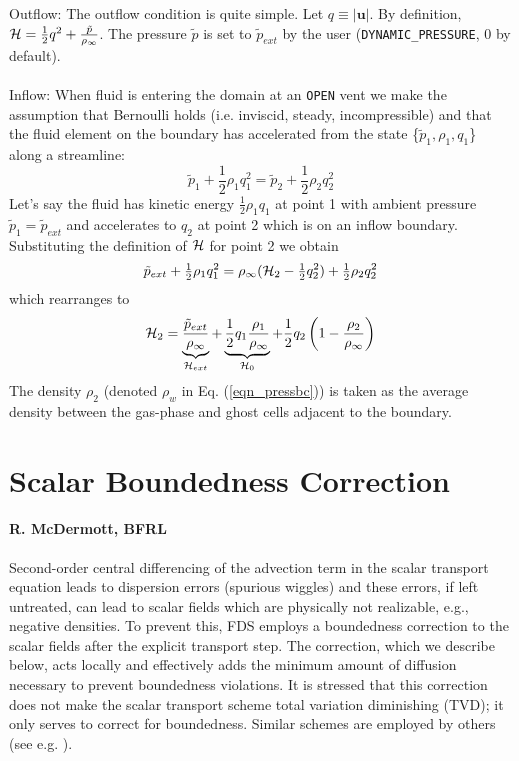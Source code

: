 \documentclass[11pt]{book}
\begin{document}
Outflow: The outflow condition is quite simple.  Let $q \equiv |\mathbf{u}|$. By definition, ${\cal H} = \frac{1}{2}q^2 + \frac{\tilde{p}}{\rho_\infty}$.  The pressure $\tilde{p}$ is set to $\tilde{p}_{ext}$ by the user ({\tt DYNAMIC\_PRESSURE}, 0 by default).
\\
\\
Inflow: When fluid is entering the domain at an {\tt OPEN} vent we make the assumption that Bernoulli holds (i.e. inviscid, steady, incompressible) and that the fluid element on the boundary has accelerated from the state \{$\tilde{p}_1,\rho_1,q_1$\} along a streamline:
\begin{equation}
\tilde{p}_1 + \mbox{$\frac{1}{2}$}\rho_1 q_1^2 = \tilde{p}_2 + \mbox{$\frac{1}{2}$}\rho_2 q_2^2
\end{equation}
Let's say the fluid has kinetic energy $\frac{1}{2}\rho_1 q_1$ at point 1 with ambient pressure $\tilde{p}_1 = \tilde{p}_{ext}$ and accelerates to $q_2$ at point 2 which is on an inflow boundary.  Substituting the definition of ${\cal H}$ for point 2 we obtain
\begin{equation}
\tilde{p}_{ext} + \mbox{$\frac{1}{2}$}\rho_1 q_1^2 = \rho_\infty({\cal H}_2 - \mbox{$\frac{1}{2}$} q_2^2) + \mbox{$\frac{1}{2}$} \rho_2 q_2^2
\end{equation}
which rearranges to
\begin{equation}
{\cal H}_2 = \underbrace{\frac{\tilde{p}_{ext}}{\rho_\infty}}_{{\cal H}_{ext}} + \underbrace{\frac{1}{2}q_1 \frac{\rho_1}{\rho_\infty}}_{{\cal H}_0} +   \frac{1}{2} q_2 \left(1-\frac{\rho_2}{\rho_\infty}\right)
\end{equation}
The density $\rho_2$ (denoted $\rho_w$ in Eq. (\ref{eqn_pressbc})) is taken as the average density between the gas-phase and ghost cells adjacent to the boundary.

\chapter{Scalar Boundedness Correction}
\subsubsection{R. McDermott, BFRL}
\label{app_boundedness}

Second-order central differencing of the advection term in the scalar transport equation leads to dispersion errors (spurious wiggles) and these errors, if left untreated, can lead to scalar fields which are physically not realizable, e.g., negative densities.  To prevent this, FDS employs a boundedness correction to the scalar fields after the explicit transport step.  The correction, which we describe below, acts locally and effectively adds the minimum amount of diffusion necessary to prevent boundedness violations.  It is stressed that this correction does not make the scalar transport scheme total variation diminishing (TVD); it only serves to correct for boundedness. Similar schemes are employed by others (see e.g. \cite{Herrmann:2005}).
\end{document}
